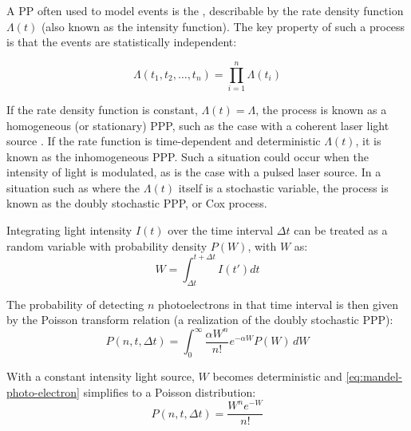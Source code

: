 A \gls{PP} often used to model events is the , describable by the rate density function $\Lambda(t)$ (also known as the intensity function). The key property of such a process is that the events are statistically independent:

\begin{equation}
    \Lambda(t_1, t_2, \dots, t_n) = \prod_{i=1}^{n} \Lambda(t_i)
\end{equation}

If the rate density function is constant, $\Lambda(t) = \Lambda$, the process is known as a homogeneous (or stationary) \gls{PPP}, such as the case with a coherent laser light source \cite{salehPhotoelectronStatistics1978}. If the rate function is time-dependent and deterministic $\Lambda(t)$, it is known as the inhomogeneous \gls{PPP}. Such a situation could occur when the intensity of light is modulated, as is the case with a pulsed laser source. In a situation such as where the $\Lambda(t)$ itself is a stochastic variable, the process is known as the doubly stochastic \gls{PPP}, or Cox process. 


Integrating light intensity $I(t)$ over the time interval $\Delta t$ can be treated as a random variable with probability density $P(W)$, with $W$ as:
\begin{equation}
    W = \int_{\Delta t}^{t+\Delta t} I(t') dt
\end{equation}

The probability of detecting $n$ photoelectrons in that time interval is then given by the Poisson transform relation \cite{mehtaVIIITheoryPhotoelectron1970} (a realization of the doubly stochastic \gls{PPP}):
\begin{equation}\label{eq:mandel-photo-electron}
    P(n, t, \Delta t) = \int_{0}^{\infty} \frac{\alpha W^n}{n!} e^{-\alpha W} P(W) \, dW
\end{equation}

With a constant intensity light source, $W$ becomes deterministic and \cref{eq:mandel-photo-electron} simplifies to a Poisson distribution:
\begin{equation}
    P(n, t, \Delta t) = \frac{W^n e^{-W}}{n!} 
\end{equation}

